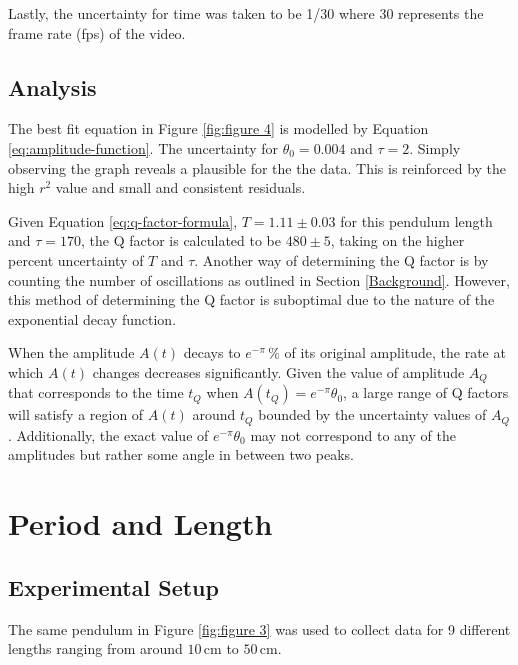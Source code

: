 \documentclass[12pt]{article}
\begin{document}
{{}

Lastly, the uncertainty for time was taken to be {\color{blue}1/30} where {\color{blue}30} represents the frame rate (fps) of the video.


\subsection{Analysis}
{\color{blue}
The best fit equation in Figure \ref{fig:figure 4} is modelled by Equation \ref{eq:amplitude-function}. The uncertainty for $\theta_0 = 0.004$ and $\tau = 2$. Simply observing the graph reveals a plausible for the the data. This is reinforced by the high $r^2$ value and small and consistent residuals.

Given Equation \ref{eq:q-factor-formula}, $T = 1.11 \pm 0.03$ for this pendulum length and $\tau = 170$, the Q factor is calculated to be $480 \pm 5$, taking on the higher percent uncertainty of $T$ and $\tau$.
Another way of determining the Q factor is by counting the number of oscillations as outlined in Section \ref{Background}. However, this method of determining the Q factor is suboptimal due to the nature of the exponential decay function.

When the amplitude $A(t)$ decays to $e^{-\pi}\,\%$ of its original amplitude, the rate at which $A(t)$ changes decreases significantly. Given the value of amplitude $A_Q$ that corresponds to the time $t_Q$ when $A(t_Q) = e^{-\pi}\theta_0$, a large range of Q factors will satisfy a region of $A(t)$ around $t_Q$ bounded by the uncertainty values of $A_Q$. Additionally, the exact value of $e^{-\pi}\theta_0$ may  not correspond to any of the amplitudes but rather some angle in between two peaks.
}


{\color{blue}

\section{Period and Length} \label{Period and Length}

\subsection{Experimental Setup}
The same pendulum in Figure \ref{fig:figure 3} was used to collect data for 9 different lengths ranging from around $10\,$cm to $50\,$cm.

}}
\end{document}
